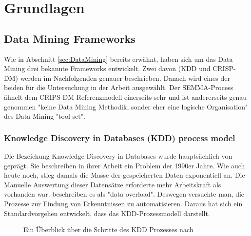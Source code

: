 \chapter{Grundlagen}

\section{Data Mining Frameworks}\label{sec:DataMiningFrameworks}
Wie in Abschnitt \ref{sec:DataMining} bereits erwähnt, haben sich um das Data Mining drei bekannte Frameworks entwickelt. Zwei davon (KDD und CRISP-DM) werden im Nachfolgenden genauer beschrieben. Danach wird eines der beiden für die Untersuchung in der Arbeit ausgewählt. Der SEMMA-Process ähnelt dem CRIPS-DM Referenzmodell einerseits sehr und ist andererseits genau genommen "keine Data Mining Methodik, sonder eher eine logische Organisation" des Data Mining "tool set"\citep[eigene Übersetzung]{enterpriseminer_sas_2012}.

\subsection{Knowledge Discovery in Databases (KDD) process model}
Die Bezeichung Knowledge Discovery in Databases wurde hauptsächlich von \citep{fayyad_data_1996} geprägt. Sie beschreiben in ihrer Arbeit ein Problem der 1990er Jahre. Wie auch heute noch, stieg damals die Masse der gespeicherten Daten exponentiell  an. Die Manuelle Auswertung dieser Datensätze erforderte mehr Arbeitskraft als vorhanden war. \citep[S.~38]{fayyad_data_1996} beschreiben es als "data overload". Deswegen versuchte man, die Prozesse zur Findung von Erkenntnissen zu automatisieren. Daraus hat sich ein Standardvorgehen entwickelt, dass das KDD-Prozessmodell darstellt.
\begin{figure}[H]
\centering
{}
\caption{Ein Überblick über die Schritte des KDD Prozesses nach \citep[S.~41]{fayyad_data_1996}}
\label{fig:kddprocess}
\end{figure}


